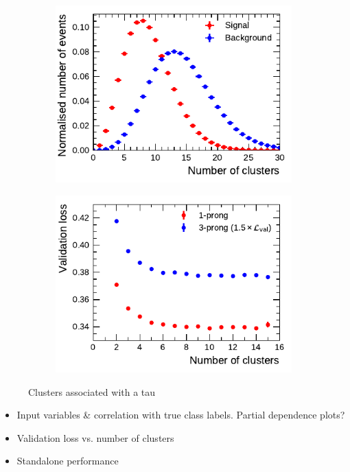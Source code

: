 \begin{figure}[ht]
  \begin{subfigure}[t]{0.48\textwidth}
    \centering
    \includegraphics{./figures/rnn/ncls_1p.pdf}
  \end{subfigure}%
  \begin{subfigure}[t]{0.48\textwidth}
    \centering
    \includegraphics{./figures/rnn/nscan/cluster_1p_3p.pdf}
  \end{subfigure}
  \caption{Clusters associated with a tau}
  \label{fig:rnn_nclusters}
\end{figure}


\begin{itemize}
\item Input variables \& correlation with true class labels. Partial
  dependence plots?
\item Validation loss vs. number of clusters
\item Standalone performance
\end{itemize}

